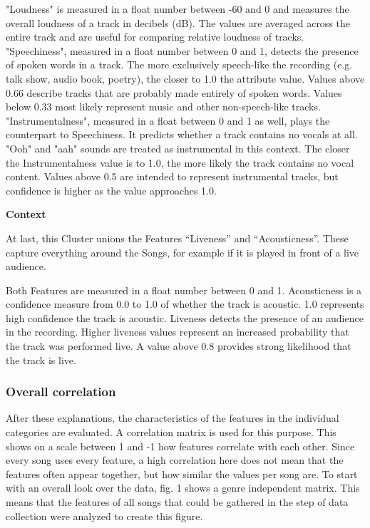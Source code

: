 "Loudness" is measured in a float number between -60 and 0 and measures the overall loudness
of a track in decibels (dB). 
The values are averaged across the entire track and are useful for comparing relative
loudness of tracks. 
"Speechiness", measured in a float number between 0 and 1, detects the presence of spoken words in a track. 
The more exclusively speech-like the recording (e.g. talk show, audio book, poetry),
the closer to 1.0 the attribute value. 
Values above 0.66 describe tracks that are probably made entirely of spoken words. Values below 0.33 most likely represent music and other non-speech-like tracks. 
"Instrumentalness", measured in a float between 0 and 1 as well, plays the counterpart to Speechiness.
It predicts whether a track contains no vocals at all. "Ooh" and "aah" sounds are treated as instrumental in this context.
The closer the Instrumentalness value is to 1.0, the more likely the track contains no vocal content. 
Values above 0.5 are intended to represent instrumental tracks, but confidence is higher as the value approaches 1.0.

\textbf{Context}

At last, this Cluster unions the Features “Liveness” and “Acousticness”.
These capture everything around the Songs, for example if it is played in front of a live audience.

Both Features are measured in a float number between 0 and 1.
Acousticness is a confidence measure from 0.0 to 1.0 of whether the track is acoustic. 1.0 represents high confidence the track is acoustic. 
Liveness detects the presence of an audience in the recording. 
Higher liveness values represent an increased probability that the track was performed live.
A value above 0.8 provides strong likelihood that the track is live. 

\subsubsection{Overall correlation}
After these explanations, the characteristics of the features in the individual categories are evaluated.
A correlation matrix is used for this purpose. This shows on a scale between 1 and -1 how
features correlate with each other. Since every song uses every feature,
a high correlation here does not mean that the features often appear together,
but how similar the values per song are. To start with an overall look over the data,
fig. 1  shows a genre independent matrix.
This means that the features of all songs that could be gathered in the step of data
collection were analyzed to create this figure. 

